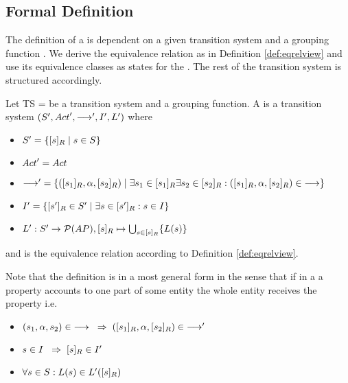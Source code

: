 \documentclass[preview]{standalone}
\begin{document}
\subsection{Formal Definition}

The definition of a \viewN is dependent on a given transition system and a grouping function \grpfct. We derive the equivalence relation \eqrelview as in Definition \ref{def:eqrelview} and use its equivalence classes  as states for the \viewN. The rest of the transition system is structured accordingly.


\begin{definition}
	
	Let TS = \transitionsystem be a transition system and \grpfct a grouping function. A \emph{\viewN}  is a transition system $({S}', {Act}',{\longrightarrow}', {I}', {L}')$  where
	
	\begin{itemize}
		\item ${S}' = \{ {[{s}]_{{R}}} \mid {s} \in {S} \}$
		
		\item ${Act}' = {Act}$
		
		\item ${\longrightarrow}' = \{ ({{[{s}_1]_{{R}}}}, {\alpha}, {{[{s}_2]_{{R}}}}) \mid \exists {s}_1 \in {\ensuremath{{[{s}_1]_{{R}}}}} \exists {s}_2 \in {\ensuremath{{[{s}_2]_{{R}}}}} : ({{[{s}_1]_{{R}}}}, {\alpha}, {{[{s}_2]_{{R}}}}) \in {\longrightarrow}\}$%
		
		\item ${I}' = \{{{[{s}']_{{R}}}} \in {S}' \mid \exists {s} \in {\ensuremath{{[{s}']_{{R}}}}} : {s} \in {I} \}$
		
		\item ${L}': {S}' \to {\mathcal{P}(\ensuremath{{AP}})}, {{[{s}]_{{R}}}}\mapsto \bigcup_{{s} \in {\ensuremath{{[{s}]_{{R}}}}}} \{{L}({s})\}$
		
	\end{itemize}
	
	and \eqrelview is the equivalence relation according to Definition \ref{def:eqrelview}.
	

	\label{def:view}	
\end{definition}

Note that the definition is in a most general form in the sense that if in a \viewN a property accounts to one part of some entity the whole entity receives the property i.e. 
\begin{itemize}	
	\item $({s}_1, {\alpha}, {s}_2) \in {\longrightarrow} {\hspace{3mm}\Rightarrow\hspace{2mm}} ({{[{s}_1]_{{R}}}}, {\alpha}, {{[{s}_2]_{{R}}}}) \in {\longrightarrow}'$
	\item ${s} \in {I} {\hspace{3mm}\Rightarrow\hspace{2mm}} {\ensuremath{{[{s}]_{{R}}}}} \in {I}'$
	\item $\forall {s} \in {S} : {L}({s}) \in {L}'({{[{s}]_{{R}}}})$
\end{itemize}
\end{document}
